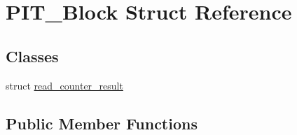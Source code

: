 \hypertarget{structPIT__Block}{\section{P\-I\-T\-\_\-\-Block Struct Reference}
\label{structPIT__Block}
}
\subsection*{Classes}
\begin{DoxyCompactItemize}
\item 
struct \hyperlink{structPIT__Block_1_1read__counter__result}{read\-\_\-counter\-\_\-result}
\end{DoxyCompactItemize}
\subsection*{Public Member Functions}
